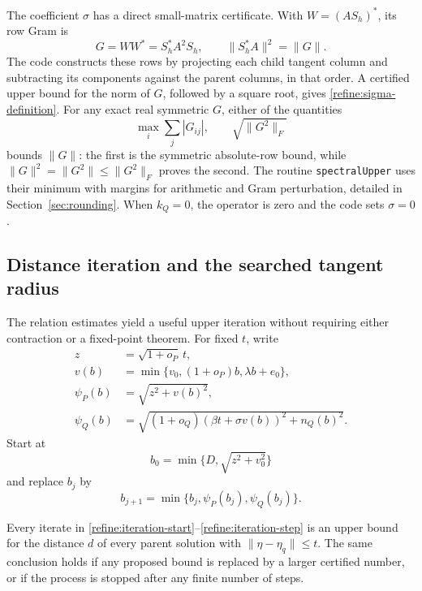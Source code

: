 The coefficient $\sigma$ has a direct small-matrix certificate.  With
$W=(AS_h)^*$, its row Gram is
\begin{equation}\label{refine:sigma-gram}
 G=WW^*=S_h^*A^2S_h,
 \qquad \|S_h^*A\|^2=\|G\|.
\end{equation}
The code constructs these rows by projecting each child tangent column
and subtracting its components against the parent columns, in that
order.  A certified upper bound for the norm of $G$, followed by a
square root, gives \eqref{refine:sigma-definition}.  For any exact real
symmetric $G$, either of the quantities
\[
 \max_i\sum_j|G_{ij}|,
 \qquad \sqrt{\|G^2\|_F}
\]
bounds $\|G\|$: the first is the symmetric absolute-row bound, while
$\|G\|^2=\|G^2\|\leq\|G^2\|_F$ proves the second.  The routine
\texttt{spectralUpper} uses their minimum with margins for arithmetic
and Gram perturbation, detailed in Section~\ref{sec:rounding}.
When $k_Q=0$, the operator is zero and the code sets $\sigma=0$.

\subsection{Distance iteration and the searched tangent radius}

The relation estimates yield a useful upper iteration without requiring
either contraction or a fixed-point theorem.  For fixed $t$, write
\begin{equation}\label{refine:iteration-functions}
 \begin{split}
 z&=\sqrt{1+o_P}\,t,\\
 v(b)&=\min\{v_0,(1+o_P)b,\lambda b+e_0\},\\
 \psi_P(b)&=\sqrt{z^2+v(b)^2},\\
 \psi_Q(b)&=
 \sqrt{(1+o_Q)(\beta t+\sigma v(b))^2+n_Q(b)^2}.
 \end{split}
\end{equation}
Start at
\begin{equation}\label{refine:iteration-start}
 b_0=\min\{D,\sqrt{z^2+v_0^2}\}
\end{equation}
and replace $b_j$ by
\begin{equation}\label{refine:iteration-step}
 b_{j+1}=\min\{b_j,\psi_P(b_j),\psi_Q(b_j)\}.
\end{equation}

\begin{lemma}\label{refine:iteration-certificate}
Every iterate in \eqref{refine:iteration-start}--\eqref{refine:iteration-step}
is an upper bound for the distance $d$ of every parent solution with
$\|\eta-\eta_q\|\leq t$.  The same conclusion holds if any proposed
bound is replaced by a larger certified number, or if the process is
stopped after any finite number of steps.
\end{lemma}

